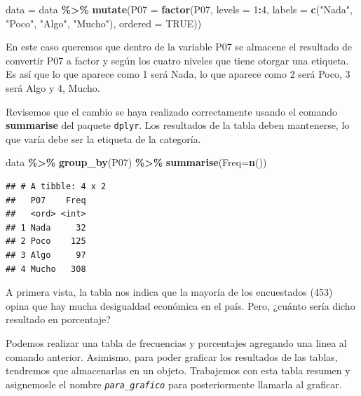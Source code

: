 \documentclass[
]{article}
\newenvironment{Shaded}{\begin{snugshade}}{\end{snugshade}}
\newcommand{\AttributeTok}[1]{\textcolor[rgb]{0.13,0.29,0.53}{#1}}
\newcommand{\ConstantTok}[1]{\textcolor[rgb]{0.56,0.35,0.01}{#1}}
\newcommand{\DecValTok}[1]{\textcolor[rgb]{0.00,0.00,0.81}{#1}}
\newcommand{\FunctionTok}[1]{\textcolor[rgb]{0.13,0.29,0.53}{\textbf{#1}}}
\newcommand{\NormalTok}[1]{#1}
\newcommand{\OtherTok}[1]{\textcolor[rgb]{0.56,0.35,0.01}{#1}}
\newcommand{\SpecialCharTok}[1]{\textcolor[rgb]{0.81,0.36,0.00}{\textbf{#1}}}
\newcommand{\StringTok}[1]{\textcolor[rgb]{0.31,0.60,0.02}{#1}}
\begin{document}
\begin{Shaded}
\begin{Highlighting}[]
\NormalTok{data }\OtherTok{=}\NormalTok{ data }\SpecialCharTok{\%\textgreater{}\%}
 \FunctionTok{mutate}\NormalTok{(}\AttributeTok{P07 =} \FunctionTok{factor}\NormalTok{(P07, }\AttributeTok{levels =} \DecValTok{1}\SpecialCharTok{:}\DecValTok{4}\NormalTok{, }\AttributeTok{labels =} \FunctionTok{c}\NormalTok{(}\StringTok{"Nada"}\NormalTok{, }\StringTok{"Poco"}\NormalTok{, }\StringTok{"Algo"}\NormalTok{, }\StringTok{"Mucho"}\NormalTok{), }\AttributeTok{ordered =} \ConstantTok{TRUE}\NormalTok{))}
\end{Highlighting}
\end{Shaded}

En este caso queremos que dentro de la variable P07 se almacene el
resultado de convertir P07 a factor y según los cuatro niveles que tiene
otorgar una etiqueta. Es así que lo que aparece como 1 será Nada, lo que
aparece como 2 será Poco, 3 será Algo y 4, Mucho.

Revisemos que el cambio se haya realizado correctamente usando el
comando \textbf{summarise} del paquete \texttt{dplyr}. Los resultados de
la tabla deben mantenerse, lo que varía debe ser la etiqueta de la
categoría.

\begin{Shaded}
\begin{Highlighting}[]
\NormalTok{data }\SpecialCharTok{\%\textgreater{}\%}
 \FunctionTok{group\_by}\NormalTok{(P07) }\SpecialCharTok{\%\textgreater{}\%}
 \FunctionTok{summarise}\NormalTok{(}\AttributeTok{Freq=}\FunctionTok{n}\NormalTok{())}
\end{Highlighting}
\end{Shaded}

\begin{verbatim}
## # A tibble: 4 x 2
##   P07    Freq
##   <ord> <int>
## 1 Nada     32
## 2 Poco    125
## 3 Algo     97
## 4 Mucho   308
\end{verbatim}

A primera vista, la tabla nos indica que la mayoría de los encuestados
(453) opina que hay mucha desigualdad económica en el país. Pero,
¿cuánto sería dicho resultado en porcentaje?

Podemos realizar una tabla de frecuencias y porcentajes agregando una
linea al comando anterior. Asimismo, para poder graficar los resultados
de las tablas, tendremos que almacenarlas en un objeto. Trabajemos con
esta tabla resumen y asignemosle el nombre \emph{\texttt{para\_grafico}}
para posteriormente llamarla al graficar.
\end{document}
